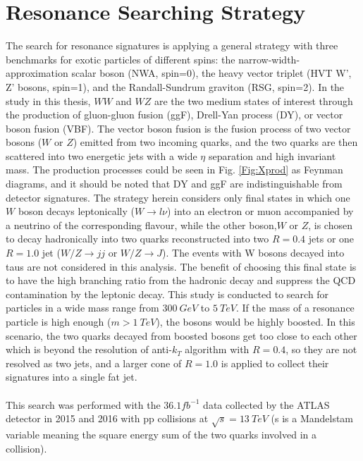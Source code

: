 \chapter{Resonance Searching Strategy}
The search for resonance signatures is applying a general strategy with three benchmarks for exotic particles of different spins: the narrow-width-approximation scalar boson (NWA, spin=0), the heavy vector triplet (HVT W', Z' bosons, spin=1), and the Randall-Sundrum graviton (RSG, spin=2).
In the study in this thesis, $WW$ and $WZ$ are the two medium states of interest through the production of gluon-gluon fusion (ggF), Drell-Yan process (DY), or vector boson fusion (VBF). The vector boson fusion is the fusion process of two vector bosons ($W$ or $Z$) emitted from two incoming quarks, and the two quarks are then scattered into two energetic jets with a wide $\eta$ separation and high invariant mass. The production processes could be seen in Fig. \ref{Fig:Xprod} as Feynman diagrams, and it should be noted that DY and ggF are indistinguishable from detector signatures. The strategy herein considers only final states in which one $W$ boson decays leptonically ($W\rightarrow l\nu$) into an electron or muon accompanied by a neutrino of the corresponding flavour, while the other boson,$W$ or $Z$, is chosen to decay hadronically into two quarks reconstructed into two $R=0.4$ jets or one $R=1.0$ jet ($W/Z\rightarrow jj$ or $W/Z\rightarrow J$). The events with W bosons decayed into taus are not considered in this analysis. The benefit of choosing this final state is to have the high branching ratio from the hadronic decay and suppress the QCD contamination by the leptonic decay. This study is conducted to search for particles in a wide mass range from $300~GeV$ to $5~TeV$. If the mass of a resonance particle is high enough ($m>1~TeV$), the bosons would be highly boosted. In this scenario, the two quarks decayed from boosted bosons get too close to each other which is beyond the resolution of anti-$k_{T}$ algorithm with $R=0.4$, so they are not resolved as two jets, and a larger cone of $R=1.0$ is applied to collect their signatures into a single fat jet. 
\\
\\This search was performed with the $36.1fb^{-1}$ data collected by the ATLAS detector in 2015 and 2016 with pp collisions at $\sqrt{s}=13~TeV$ (s is a Mandelstam variable meaning the square energy sum of the two quarks involved in a collision). 

